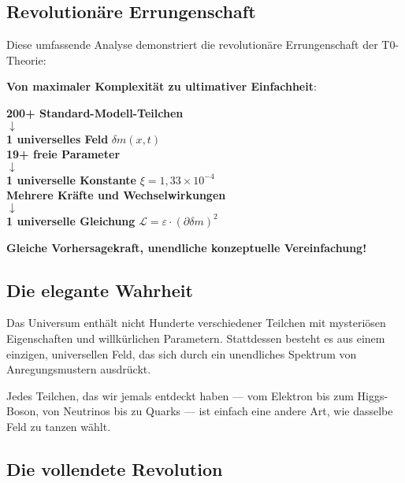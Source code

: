 \documentclass[12pt,a4paper]{article}
\newcommand{\deltam}{\delta m}
\newcommand{\xipar}{\xi}
\newcommand{\Lag}{\mathcal{L}}
\begin{document}
	\subsection{Revolutionäre Errungenschaft}
	
	Diese umfassende Analyse demonstriert die revolutionäre Errungenschaft der T0-Theorie:
	
	\begin{tcolorbox}[colback=green!5!white,colframe=green!75!black,title=Die vollständige Vereinheitlichung]
		\textbf{Von maximaler Komplexität zu ultimativer Einfachheit}:
		
		\begin{center}
			\textbf{200+ Standard-Modell-Teilchen} \\
			$\downarrow$ \\
			\textbf{1 universelles Feld} $\deltam(x,t)$ \\[1em]
			
			\textbf{19+ freie Parameter} \\
			$\downarrow$ \\
			\textbf{1 universelle Konstante} $\xipar = 1{,}33 \times 10^{-4}$ \\[1em]
			
			\textbf{Mehrere Kräfte und Wechselwirkungen} \\
			$\downarrow$ \\
			\textbf{1 universelle Gleichung} $\Lag = \varepsilon \cdot (\partial \deltam)^2$
		\end{center}
		
		\textbf{Gleiche Vorhersagekraft, unendliche konzeptuelle Vereinfachung!}
	\end{tcolorbox}
	
	\subsection{Die elegante Wahrheit}
	
	Das Universum enthält nicht Hunderte verschiedener Teilchen mit mysteriösen Eigenschaften und willkürlichen Parametern. Stattdessen besteht es aus einem einzigen, universellen Feld, das sich durch ein unendliches Spektrum von Anregungsmustern ausdrückt.
	
	Jedes Teilchen, das wir jemals entdeckt haben --- vom Elektron bis zum Higgs-Boson, von Neutrinos bis zu Quarks --- ist einfach eine andere Art, wie dasselbe Feld zu tanzen wählt.
	
	\subsection{Die vollendete Revolution}
	
\end{document}
